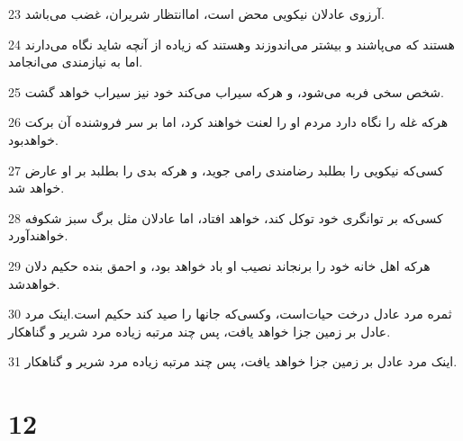 \par 23 آرزوی عادلان نیکویی محض است، اماانتظار شریران، غضب می‌باشد.
\par 24 هستند که می‌پاشند و بیشتر می‌اندوزند وهستند که زیاده از آنچه شاید نگاه می‌دارند اما به نیازمندی می‌انجامد.
\par 25 شخص سخی فربه می‌شود، و هر‌که سیراب می‌کند خود نیز سیراب خواهد گشت.
\par 26 هر‌که غله را نگاه دارد مردم او را لعنت خواهند کرد، اما بر سر فروشنده آن برکت خواهدبود.
\par 27 کسی‌که نیکویی را بطلبد رضامندی رامی جوید، و هر‌که بدی را بطلبد بر او عارض خواهد شد.
\par 28 کسی‌که بر توانگری خود توکل کند، خواهد افتاد، اما عادلان مثل برگ سبز شکوفه خواهند‌آورد.
\par 29 هر‌که اهل خانه خود را برنجاند نصیب او باد خواهد بود، و احمق بنده حکیم دلان خواهدشد.
\par 30 ثمره مرد عادل درخت حیات‌است، وکسی‌که جانها را صید کند حکیم است.اینک مرد عادل بر زمین جزا خواهد یافت، پس چند مرتبه زیاده مرد شریر و گناهکار.
\par 31 اینک مرد عادل بر زمین جزا خواهد یافت، پس چند مرتبه زیاده مرد شریر و گناهکار.
 
\chapter{12}

